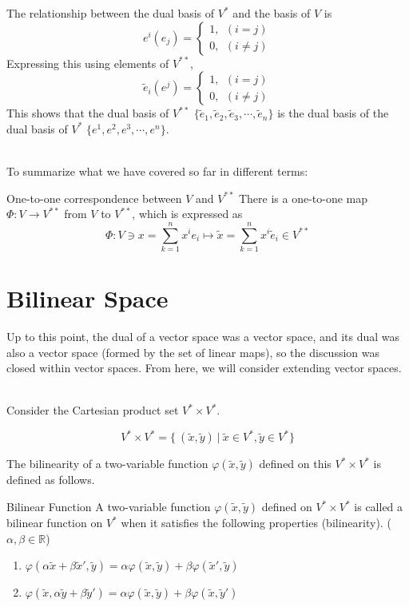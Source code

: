 \documentclass[uplatex,a4j,12pt,dvipdfmx]{jsarticle}
\begin{document}
The relationship between the dual basis of $V^{*}$ and the basis of $V$ is
\[
	e^{i}(e_{j})
	=
	\left\{
	\begin{array}{l}
		1, \ \ (i=j) \\
		0, \ \ (i \neq j)
	\end{array}
	\right.
\]
Expressing this using elements of $V^{**}$,
\[
	\tilde{e}_{i}(e^{j})
	=
	\left\{
	\begin{array}{l}
		1, \ \ (i=j) \\
		0, \ \ (i \neq j)
	\end{array}
	\right.
\]
This shows that
the dual basis of $V^{**}$
$\{ \tilde{e}_{1}, \tilde{e}_{2}, \tilde{e}_{3}, \cdots , \tilde{e}_{n} \}$
is
the dual basis of the dual basis of $V^{*}$
$\{ e^{1}, e^{2}, e^{3}, \cdots , e^{n} \}$.

\ \\

To summarize what we have covered so far in different terms:

\begin{itembox}[l]{One-to-one correspondence between $V$ and $V^{**}$}
	There is a one-to-one map $\Phi : V \to V^{**}$
	from $V$ to $V^{**}$,
	which is expressed as
	$$
		\Phi: V \ni x = \sum_{k=1}^{n} x^{i} e_{i} \mapsto \tilde{x} = \sum_{k=1}^{n} x^{i} \tilde{e}_{i} \in V^{**}
	$$
\end{itembox}



\section{Bilinear Space}

Up to this point, the dual of a vector space was a vector space, and its dual was also a vector space (formed by the set of linear maps), so the discussion was closed within vector spaces.
From here, we will consider extending vector spaces.

\ \\

Consider the Cartesian product set $V^{*} \times V^{*}$.

$$
	V^{*} \times V^{*}
	=
	\{
	\ (\tilde{x}, \tilde{y} ) \ | \ \tilde{x} \in V^{*}, \tilde{y} \in V^{*}
	\}
$$

The bilinearity of a two-variable function
$\varphi(\tilde{x},\tilde{y})$ defined on this $V^{*} \times V^{*}$ is defined as follows.


\begin{itembox}[l]{Bilinear Function}
	A two-variable function $\varphi(\tilde{x},\tilde{y})$
	defined on $V^{*} \times V^{*}$
	is called a bilinear function on $V^{*}$
	when it satisfies the following properties (bilinearity). ($\alpha, \beta \in \mathbb{R}$)
	\begin{enumerate}
		\item $\varphi(\alpha \tilde{x} + \beta \tilde{x}', \tilde{y}) = \alpha \varphi( \tilde{x}, \tilde{y}) + \beta \varphi( \tilde{x}', \tilde{y})$
		\item $\varphi(\tilde{x}, \alpha \tilde{y} + \beta \tilde{y}') = \alpha \varphi( \tilde{x}, \tilde{y}) + \beta \varphi( \tilde{x}, \tilde{y}')$
	\end{enumerate}
\end{itembox}
\end{document}
